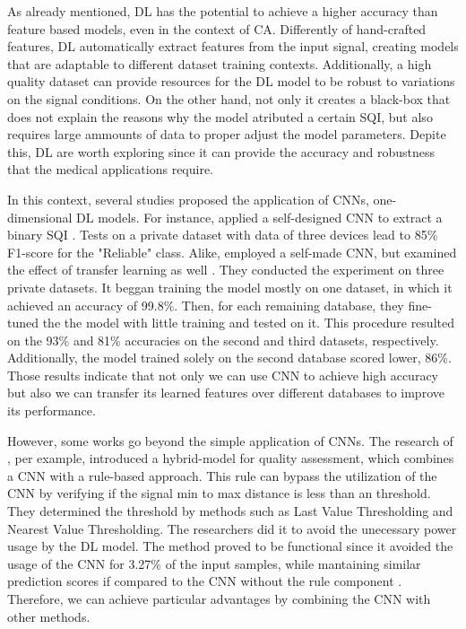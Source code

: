 As already mentioned, \acrfull{DL} has the potential to achieve a higher accuracy than feature based models, even in the context of \acrshort{CA}. Differently of hand-crafted features, \acrshort{DL} automatically extract features from the input signal, creating models that are adaptable to different dataset training contexts. Additionally, a high quality dataset can provide resources for the \acrshort{DL} model to be robust to variations on the signal conditions. On the other hand, not only it creates a black-box that does not explain the reasons why the model atributed a certain \acrshort{SQI}, but also requires large ammounts of data to proper adjust the model parameters. Depite this, \acrshort{DL} are worth exploring since it can provide the accuracy and robustness that the medical applications require. 

In this context, several studies proposed the application of \acrshort{CNN}s, one-dimensional \acrshort{DL} models. For instance, \citeauthor{review-8} applied a self-designed \acrshort{CNN} to extract a binary \acrshort{SQI} \cite{review-8}. Tests on a private dataset with data of three devices lead to 85\% F1-score for the "Reliable" class. Alike, \citeauthor{review-9} employed a self-made \acrshort{CNN}, but examined the effect of transfer learning as well \cite{review-9}. They conducted the experiment on three private datasets. It beggan training the model mostly on one dataset, in which it achieved an accuracy of 99.8\%. Then, for each remaining database, they fine-tuned the the model with little training and tested on it. This procedure resulted on the 93\% and 81\% accuracies on the second and third datasets, respectively. Additionally, the model trained solely on the second database scored lower, 86\%. Those results indicate that not only we can use \acrshort{CNN} to achieve high accuracy but also we can transfer its learned features over different databases to improve its performance.

However, some works go beyond the simple application of \acrshort{CNN}s. The research of \citeauthor{review-10}, per example, introduced a hybrid-model for quality assessment, which combines a \acrshort{CNN} with a rule-based approach. This rule can bypass the utilization of the \acrshort{CNN} by verifying if the signal min to max distance is less than an threshold. They determined the threshold by methods such as Last Value Thresholding and Nearest Value Thresholding. The researchers did it to avoid the unecessary power usage by the \acrshort{DL} model. The method proved to be functional since it avoided the usage of the \acrshort{CNN} for 3.27\% of the input samples, while mantaining similar prediction scores if compared to the \acrshort{CNN} without the rule component \cite{review-10}. Therefore, we can achieve particular advantages by combining the \acrshort{CNN} with other methods.  

